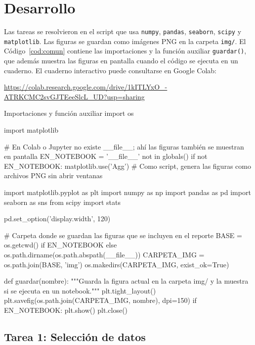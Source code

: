 \documentclass[11pt,letterpaper]{article}
\begin{document}
\section{Desarrollo}

Las tareas se resolvieron en el script que usa \texttt{numpy}, \texttt{pandas}, \texttt{seaborn}, \texttt{scipy} y \texttt{matplotlib}. Las figuras se guardan como imágenes PNG en la carpeta \texttt{img/}. El Código~\ref{cod:comun} contiene las importaciones y la función auxiliar \texttt{guardar()}, que además muestra las figuras en pantalla cuando el código se ejecuta en un cuaderno. El cuaderno interactivo puede consultarse en Google Colab:

\begin{center}
    \url{https://colab.research.google.com/drive/1kITLYxO_-ATRKCMC2svGJTEeeSlcL_UD?usp=sharing}
\end{center}

\begin{codigo}[label=cod:comun]{Importaciones y función auxiliar}
import os

import matplotlib

# En Colab o Jupyter no existe __file__; ahí las figuras también se muestran en pantalla
EN_NOTEBOOK = '__file__' not in globals()
if not EN_NOTEBOOK:
    matplotlib.use('Agg')  # Como script, genera las figuras como archivos PNG sin abrir ventanas

import matplotlib.pyplot as plt
import numpy as np
import pandas as pd
import seaborn as sns
from scipy import stats

pd.set_option('display.width', 120)

# Carpeta donde se guardan las figuras que se incluyen en el reporte
BASE = os.getcwd() if EN_NOTEBOOK else os.path.dirname(os.path.abspath(__file__))
CARPETA_IMG = os.path.join(BASE, 'img')
os.makedirs(CARPETA_IMG, exist_ok=True)


def guardar(nombre):
    """Guarda la figura actual en la carpeta img/ y la muestra si se ejecuta en un notebook."""
    plt.tight_layout()
    plt.savefig(os.path.join(CARPETA_IMG, nombre), dpi=150)
    if EN_NOTEBOOK:
        plt.show()
    plt.close()
\end{codigo}

\subsection{Tarea 1: Selección de datos}
\end{document}
